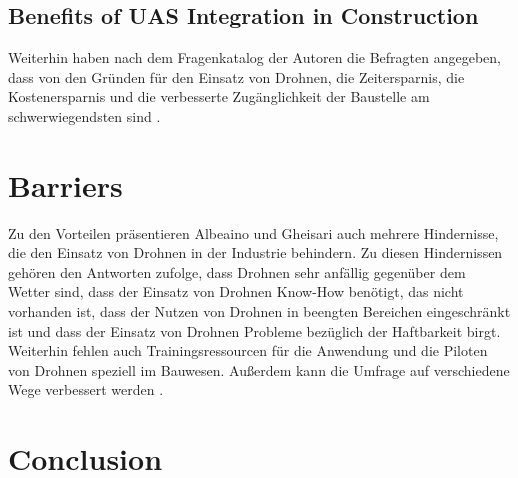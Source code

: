 \subsection{Benefits of UAS Integration in Construction}

Weiterhin haben nach dem Fragenkatalog der Autoren die Befragten angegeben, dass von den Gründen für den Einsatz von Drohnen, die Zeitersparnis, die Kostenersparnis und die verbesserte Zugänglichkeit der Baustelle am schwerwiegendsten sind \cite[S. 98--99]{abaeano2021trends}.

\section{Barriers}


Zu den Vorteilen präsentieren Albeaino und Gheisari auch mehrere Hindernisse, die den Einsatz von Drohnen in der Industrie behindern.
Zu diesen Hindernissen gehören den Antworten zufolge, dass Drohnen sehr anfällig gegenüber dem Wetter sind, dass der Einsatz von Drohnen Know-How benötigt, das nicht vorhanden ist, dass der Nutzen von Drohnen in beengten Bereichen eingeschränkt ist und dass der Einsatz von Drohnen Probleme bezüglich der Haftbarkeit birgt.
Weiterhin fehlen auch Trainingsressourcen für die Anwendung und die Piloten von Drohnen speziell im Bauwesen.
Außerdem kann die Umfrage auf verschiedene Wege verbessert werden \cite[S. 99--104]{abaeano2021trends}.

\section{Conclusion}

